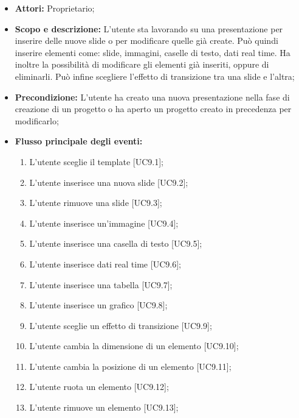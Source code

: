 \begin{itemize}
	\item \textbf{Attori:} Proprietario;
	\item \textbf{Scopo e descrizione:} L'utente sta lavorando su una presentazione per inserire delle nuove \gls{slide} o per modificare quelle già create. Può quindi inserire  elementi come: \gls{slide}, immagini, caselle di testo, dati \gls{real time}. Ha inoltre la possibilità di modificare gli elementi già inseriti, oppure di eliminarli. Può infine scegliere l'effetto di transizione tra una \gls{slide} e l'altra;
	\item \textbf{Precondizione:} L'utente ha creato una nuova presentazione nella fase di creazione di un progetto o ha aperto un progetto creato in precedenza per modificarlo;
	\item \textbf{Flusso principale degli eventi:}
	\begin{enumerate}
		
		\item L'utente sceglie il \gls{template} [UC9.1];
		
		\item L'utente inserisce una nuova \gls{slide} [UC9.2];
		\item L'utente rimuove una \gls{slide} [UC9.3];
		
		\item L'utente inserisce un'immagine [UC9.4];
		
		\item L'utente inserisce una casella di testo [UC9.5];
		
		\item L'utente inserisce dati \gls{real time} [UC9.6];
		
		\item L'utente inserisce una tabella [UC9.7];
		
		\item L'utente inserisce un grafico [UC9.8];
		
		\item L'utente sceglie un effetto di transizione [UC9.9];
		
		\item L'utente cambia la dimensione di un elemento [UC9.10];
		
		\item L'utente cambia la posizione di un elemento [UC9.11];
		
		\item L'utente ruota un elemento [UC9.12];
		
		\item L'utente rimuove un elemento [UC9.13];
		

\end{enumerate}
\end{itemize}
